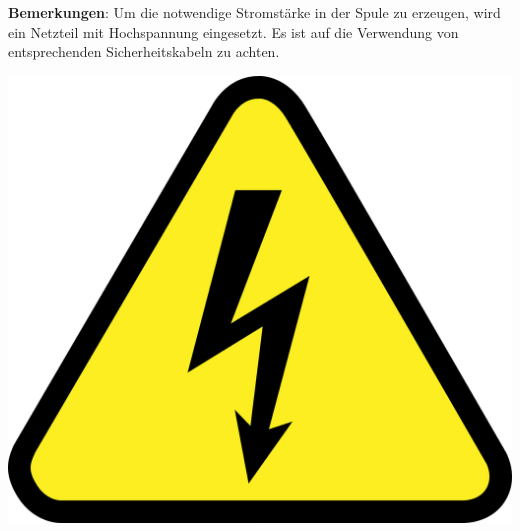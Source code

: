 \documentclass[../main.tex]{subfiles}
\begin{document}
\begin{tcolorbox}
    \vspace{0.5cm}
    \begin{minipage}[c]{0.85\textwidth}
        \textbf{Bemerkungen}: Um die notwendige Stromstärke in der Spule zu erzeugen, wird ein Netzteil mit Hochspannung eingesetzt. Es ist auf die Verwendung von entsprechenden Sicherheitskabeln zu achten.    
    \end{minipage}
    \hspace{0.5cm}
    \begin{minipage}[c]{0.1\textwidth}
        \centering
        \includegraphics[width=1\textwidth]{img/hochspannung}
    \end{minipage}

\end{tcolorbox}
\end{document}
